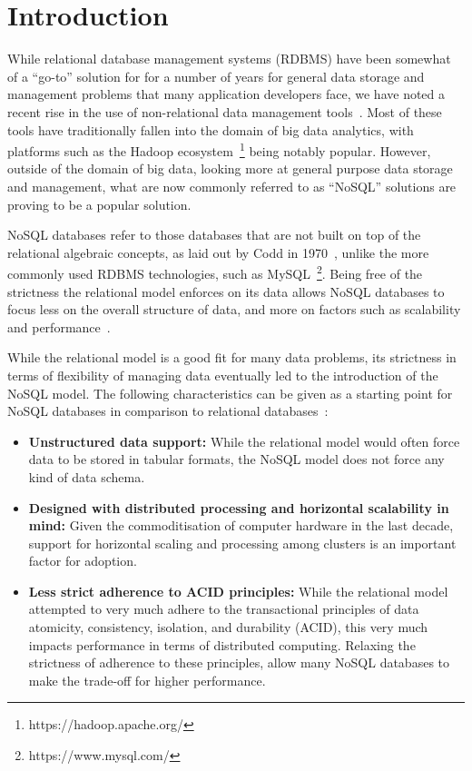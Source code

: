 \documentclass[a4paper,11pt]{article}
\begin{document}

\newpage
{}
\tableofcontents
\newpage



\section{Introduction} %
\label{sec:introduction}

While relational database management systems (RDBMS) have been somewhat of a ``go-to'' solution for for a number of years
for general data storage and management problems that many application developers face, we have noted a recent rise
in the use of non-relational data management tools~\cite{padhy2011rdbms}. Most of these tools have traditionally fallen into the domain of
big data analytics, with platforms such as the Hadoop ecosystem~\footnote{https://hadoop.apache.org/} being notably popular.
However, outside of the domain of big data, looking more at general purpose data storage and management, what are now
commonly referred to as ``NoSQL'' solutions are proving to be a popular solution.

NoSQL databases refer to those databases that are not built on top of the relational algebraic concepts, as laid out by
Codd in 1970~\cite{codd1970relational}, unlike the more commonly used RDBMS technologies, such as
MySQL~\footnote{https://www.mysql.com/}. Being free of the strictness the relational model enforces on its data allows
NoSQL databases to focus less on the overall structure of data, and more on factors such as scalability and
performance~\cite{leavitt2010will}.

While the relational model is a good fit for many data problems, its strictness in terms of flexibility of managing data
eventually led to the introduction of the NoSQL model. The following characteristics can be given as a starting point
for NoSQL databases in comparison to relational databases~\cite{indrawan2012database}:

\begin{itemize}
  \item \textbf{Unstructured data support:} While the relational model would often force data to be stored in tabular
  formats, the NoSQL model does not force any kind of data schema.
  \item \textbf{Designed with distributed processing and horizontal scalability in mind:} Given the commoditisation of
  computer hardware in the last decade, support for horizontal scaling and processing among clusters is an important
  factor for adoption.
  \item \textbf{Less strict adherence to ACID principles:} While the relational model attempted to very much adhere to
  the transactional principles of data atomicity, consistency, isolation, and durability (ACID), this very much impacts
  performance in terms of distributed computing. Relaxing the strictness of adherence to these principles, allow many
  NoSQL databases to make the trade-off for higher performance.
\end{itemize}
\end{document}
